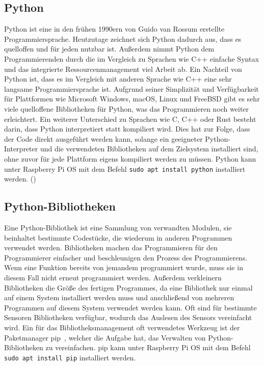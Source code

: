 \subsection{Python}
\label{subsec:tPython}
Python ist eine in den frühen 1990ern von Guido van Rossum erstellte Programmiersprache. Heutzutage zeichnet sich Python dadurch aus, dass es quelloffen und für jeden nutzbar ist. Außerdem nimmt Python dem Programmierenden durch die im Vergleich zu Sprachen wie C++ einfache Syntax und das integrierte Ressourcenmanagement viel Arbeit ab. Ein Nachteil von Python ist, dass es im Vergleich mit anderen Sprache wie C++ eine sehr langsame Programmiersprache ist. Aufgrund seiner Simplizität und Verfügbarkeit für Plattformen wie Microsoft Windows, macOS, Linux und FreeBSD gibt es sehr viele quelloffene Bibliotheken für Python, was das Programmieren noch weiter erleichtert. Ein weiterer Unterschied zu Sprachen wie C, C++ oder Rust besteht darin, dass Python interpretiert statt kompiliert wird. Dies hat zur Folge, dass der Code direkt ausgeführt werden kann, solange ein geeigneter Python-Interpreter und die verwendeten Bibliotheken auf dem Zielsystem installiert sind, ohne zuvor für jede Plattform eigens kompiliert werden zu müssen. Python kann unter Raspberry Pi OS mit dem Befehl \verb|sudo apt install python| installiert werden.
(\cite{matthes-2019})

\subsection{Python-Bibliotheken}
\label{subsec:tLibPython}
Eine Python-Bibliothek ist eine Sammlung von verwandten Modulen, sie beinhaltet bestimmte Codestücke, die wiederum in anderen Programmen verwendet werden. Bibliotheken machen das Programmieren für den Programmierer einfacher und beschleunigen den Prozess des Programmierens. Wenn eine Funktion bereits von jemandem programmiert wurde, muss sie in diesem Fall nicht erneut programmiert werden. Außerdem verkleinern Bibliotheken die Größe des fertigen Programmes, da eine Bibliothek nur einmal auf einem System installiert werden muss und anschließend von mehreren Programmen auf diesem System verwendet werden kann. Oft sind für bestimmte Sensoren Bibliotheken verfügbar, wodurch das Auslesen des Sensors vereinfacht wird. Ein für das Bibliotheksmanagement oft verwendetes Werkzeug ist der Paketmanager \glqq pip\grqq\ , welcher die Aufgabe hat, das Verwalten von Python-Bibliotheken zu vereinfachen. pip kann unter Raspberry Pi OS mit dem Befehl \verb|sudo apt install pip| installiert werden.

